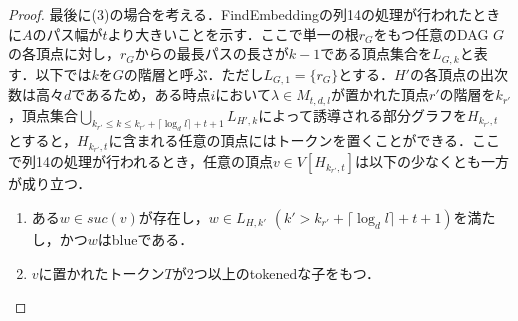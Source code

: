 \documentclass[master]{kuisthesis}		%
\theoremstyle{plain}
\theoremstyle{definition}
\begin{document}
\begin{proof}
最後に(3)の場合を考える．FindEmbeddingの列14の処理が行われたときに$A$のパス幅が$t$より大きいことを示す．ここで単一の根$r_G$をもつ任意のDAG $G$の各頂点に対し，$r_G$からの最長パスの長さが$k-1$である頂点集合を$L_{G, k}$と表す．以下では$k$を$G$の階層と呼ぶ．ただし$L_{G, 1} = \{r_G\}$とする．$H'$の各頂点の出次数は高々$d$であるため，ある時点$i$において$\lambda \in M_{t, d, l}$が置かれた頂点$r'$の階層を$k_{r'}$，頂点集合$\bigcup_{k_{r'} \leq k \leq k_{r'}+ \lceil \log_d l \rceil +t+1} L_{H', k}$によって誘導される部分グラフを$H_{k_{r'}, t}$とすると，$H_{k_{r'}, t}$に含まれる任意の頂点にはトークンを置くことができる．ここで列14の処理が行われるとき，任意の頂点$v \in V[H_{k_{r'}, t}]$は以下の少なくとも一方が成り立つ．

\begin{enumerate}
    \item ある$w \in suc(v)$が存在し，$w \in L_{H, k'}$ $(k' > k_{r'}+ \lceil \log_d l \rceil +t+1)$を満たし，かつ$w$はblueである． \label{cond1}
    \item $v$に置かれたトークン$T$が2つ以上のtokenedな子をもつ． \label{cond2}
\end{enumerate}


\end{proof}
\end{document}
